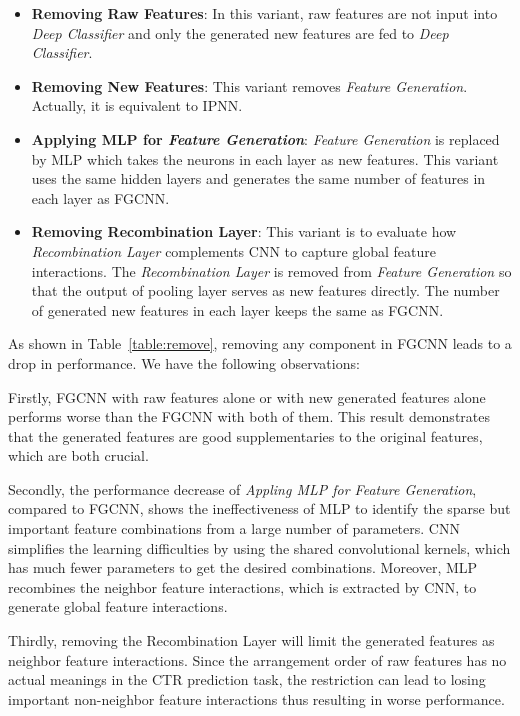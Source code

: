 \begin{itemize}
\item \textbf{Removing Raw Features}: In this variant, raw features are not input into \textit{Deep Classifier} and only the  generated new  features are fed to \emph{Deep Classifier}.
 \item \textbf{Removing New Features}: This variant removes \emph{Feature Generation}. Actually, it is equivalent to IPNN.
 \item \textbf{Applying MLP for \textit{Feature Generation}}: \emph{Feature Generation} is replaced by MLP which takes the neurons in each layer as new features. This variant uses the same hidden layers and generates the same number of features in each layer as FGCNN.
 \item \textbf{Removing Recombination Layer}: This variant is to evaluate how \emph{Recombination Layer} complements CNN to capture global feature interactions.  The \emph{Recombination Layer} is removed from \emph{Feature Generation}   so that the output of pooling layer serves as new features directly. The number of generated new features in each layer keeps the same as FGCNN.
\end{itemize}

As shown in  Table~\ref{table:remove}, removing any component in FGCNN leads to a drop in performance. We have the following observations:

Firstly, FGCNN with raw features alone or with new generated features alone performs worse than the FGCNN with both of them. This result demonstrates that the generated features are good supplementaries to the original features, which are both crucial.

Secondly, the performance decrease of \textit{Appling MLP for Feature Generation}, compared to FGCNN, shows the ineffectiveness of MLP to identify the sparse but important feature combinations from a large number of parameters. CNN simplifies the learning difficulties by using the shared convolutional kernels, which has much fewer parameters to get the desired combinations. Moreover,  MLP recombines the neighbor feature interactions, which is extracted by CNN, to generate global feature interactions.

Thirdly, removing the Recombination Layer will limit the generated features as neighbor feature interactions. Since the arrangement order of raw features has no actual meanings in the CTR prediction task,  the restriction can lead to losing important non-neighbor feature interactions thus resulting in worse performance.







